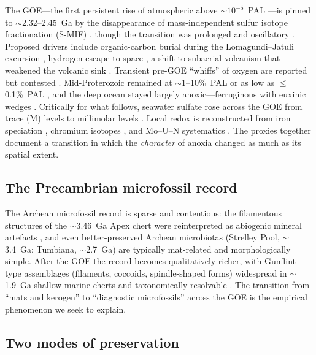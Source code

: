 \documentclass[11pt]{article}
\begin{document}
The GOE---the first persistent rise of atmospheric  above $\sim$$10^{-5}$~PAL
\citep{Holland2002,Holland2006,Canfield2005,Catling2005}---is pinned to $\sim$2.32--2.45~Ga by the
disappearance of mass-independent sulfur isotope fractionation (S-MIF)
\citep{Bekker2004,Farquhar2003}, though the transition was prolonged and oscillatory
\citep{Lyons2014,Garduno2024}. Proposed drivers include organic-carbon burial during the
Lomagundi--Jatuli excursion \citep{Bekker2012,Hodgskiss2023}, hydrogen escape to space
\citep{Catling2001}, a shift to subaerial volcanism that weakened the volcanic  sink
\citep{Kump2007}. Transient pre-GOE ``whiffs'' of
oxygen are reported but contested \citep{Anbar2007,Gregory2022}. Mid-Proterozoic  remained
at $\sim$1--10\%~PAL \citep{Lyons2014} or as low as $\le$0.1\%~PAL \citep{Planavsky2014}, and the
deep ocean stayed largely anoxic---ferruginous with euxinic wedges
\citep{Canfield1998}. Critically for what follows, seawater sulfate rose across the
GOE from trace (\textmu M) levels to millimolar levels \citep{Habicht2002,Kah2004,Crowe2014}. Local
redox is reconstructed from iron speciation
\citep[$\mathrm{Fe_{HR}}/\mathrm{Fe_T}>0.38$;][]{Poulton2005,Poulton2011}, chromium isotopes
\citep{Frei2009}, and Mo--U--N systematics \citep{Scott2008,Garvin2009}. The proxies
together document a transition in which the \emph{character} of anoxia changed as much as its
spatial extent.

\subsection{The Precambrian microfossil record}

The Archean microfossil record is sparse and contentious: the filamentous structures of the
$\sim$3.46~Ga Apex chert \citep{Schopf1993} were reinterpreted as abiogenic mineral artefacts
\citep{Brasier2002}, and even better-preserved Archean microbiotas (Strelley Pool, $\sim$3.4~Ga;
Tumbiana, $\sim$2.7~Ga) are typically mat-related and morphologically simple. After the GOE the
record becomes qualitatively richer, with Gunflint-type assemblages (filaments, coccoids,
spindle-shaped forms) widespread in $\sim$1.9~Ga shallow-marine cherts and taxonomically
resolvable \citep{Javaux2018,Wacey2012,Wacey2014}. The transition from ``mats and kerogen'' to
``diagnostic microfossils'' across the GOE is the empirical phenomenon we seek to explain.

\subsection{Two modes of preservation}
\end{document}
